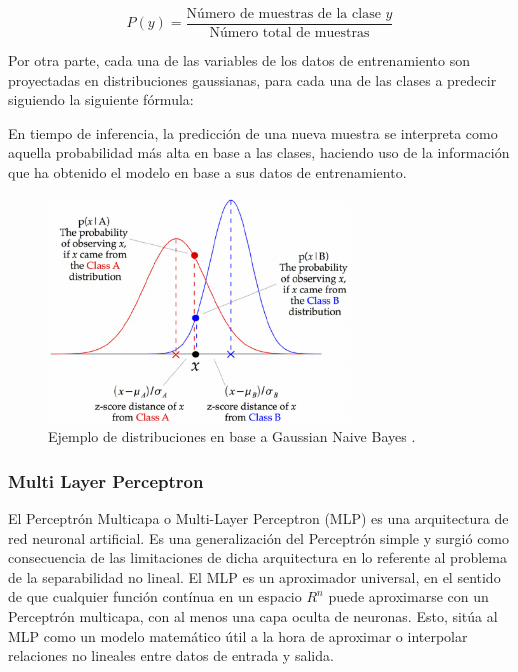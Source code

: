 \documentclass{uathesis-es}
\begin{document}
\[
    P(y) = \frac{\text{Número de muestras de la clase } y}{\text{Número total de muestras}}
\]

Por otra parte, cada una de las variables de los datos de entrenamiento son proyectadas en distribuciones gaussianas, para cada una de las clases a predecir siguiendo la siguiente fórmula:


En tiempo de inferencia, la predicción de una nueva muestra se interpreta como aquella probabilidad más alta en base a las clases, haciendo uso de la información que ha obtenido el modelo en base a sus datos de entrenamiento.


\begin{figure}[H]
    \centering
    \includegraphics[width=8cm]{Figures/Background/GNB.png}
    \caption{Ejemplo de distribuciones en base a Gaussian Naive Bayes \cite{GNBIMAGE}.}
    \label{GNB_BACKGROUND}
\end{figure}


\subsubsection*{Multi Layer Perceptron}




El Perceptrón Multicapa o Multi-Layer Perceptron (MLP) es una arquitectura de red neuronal artificial. Es una generalización del Perceptrón simple y surgió como consecuencia de las limitaciones de dicha arquitectura en lo referente al problema de la separabilidad no lineal. El MLP es un aproximador universal, en el sentido de que cualquier función contínua en un espacio $R^n$ puede aproximarse con un Perceptrón multicapa, con al menos una capa oculta de neuronas. Esto, sitúa al MLP como un modelo matemático útil a la hora de aproximar o interpolar relaciones no lineales entre datos de entrada y salida.
\end{document}
